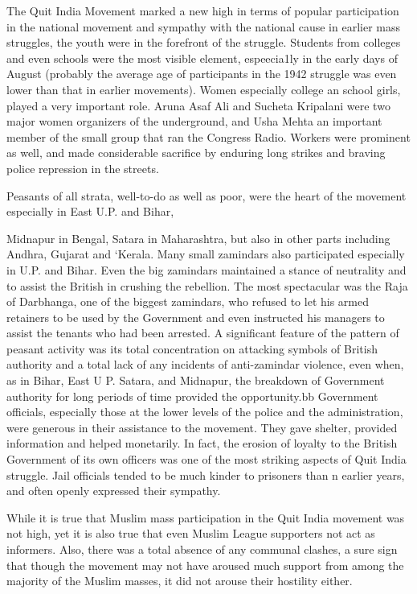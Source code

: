 The Quit India Movement marked a new high in terms of popular participation in the national movement and sympathy with the national cause in earlier mass struggles, the youth were in the forefront of the struggle. Students from colleges and even schools were the most visible element, espeecia1ly in the early days of August (probably the average age of participants in the 1942 struggle was even lower than that in earlier movements). Women especially college an school girls, played a very important role. Aruna Asaf Ali and Sucheta Kripalani were two major women organizers of the underground, and Usha Mehta an important member of the small group that ran the Congress Radio. Workers were prominent as well, and made considerable sacrifice by enduring long strikes and braving police repression in the streets.

Peasants of all strata, well-to-do as well as poor, were the heart of the movement especially in East U.P. and Bihar,

Midnapur in Bengal, Satara in Maharashtra, but also in other parts including Andhra, Gujarat and `Kerala. Many small zamindars also participated especially in U.P. and Bihar. Even the big zamindars maintained a stance of neutrality and to assist the British in crushing the rebellion. The most spectacular was the Raja of Darbhanga, one of the biggest zamindars, who refused to let his armed retainers to be used by the Government and even instructed his managers to assist the tenants who had been arrested. A significant feature of the pattern of peasant activity was its total concentration on attacking symbols of British authority and a total lack of any incidents of anti-zamindar violence, even when, as in Bihar, East U P. Satara, and Midnapur, the breakdown of Government authority for long periods of time provided the opportunity.bb Government officials, especially those at the lower levels of the police and the administration, were generous in their assistance to the movement. They gave shelter, provided information and helped monetarily. In fact, the erosion of loyalty to the British Government of its own officers was one of the most striking aspects of Quit India struggle. Jail officials tended to be much kinder to prisoners than n earlier years, and often openly expressed their sympathy.

While it is true that Muslim mass participation in the Quit India movement was not high, yet it is also true that even Muslim League supporters not act as informers. Also, there was a total absence of any communal clashes, a sure sign that though the movement may not have aroused much support from among the majority of the Muslim masses, it did not arouse their hostility either.

